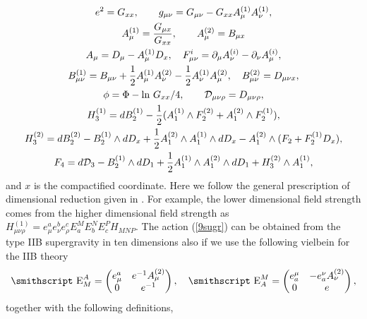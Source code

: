 \documentclass[a4paper,12pt]{article}
\newcommand{\mathst}[1]{\mbox{\smithscript #1}}
\begin{document}
\begin{subequations}
\begin{gather}
\label{iia29a}
e^2=G_{xx},\qquad g_{\mu\nu}=G_{\mu\nu}-
G_{xx}A^{(1)}_\mu A^{(1)}_\nu,\\
\label{iia29b}
A^{(1)}_\mu={G_{\mu x}\over G_{xx}},
\qquad A^{(2)}_\mu=B_{\mu x}\\
\label{iia29c}
A_\mu=D_\mu-A^{(1)}_\mu D_x,\quad
F^{i}_{\mu\nu}=\partial_\mu A^{(i)}_\nu
-\partial_\nu A^{(i)}_\mu,\\
\label{iia29d}
B^{(1)}_{\mu\nu}=B_{\mu\nu}+
{1\over 2}A^{(1)}_\mu A^{(2)}_\nu
-{1\over 2}A^{(1)}_\nu A^{(2)}_\mu,\quad 
B^{(2)}_{\mu\nu}=D_{\mu\nu x},\\
\label{iia29e}
\phi=\Phi-\ln\,G_{xx}/4, \qquad 
{\cal D}_{\mu\nu\rho}=D_{\mu\nu\rho},\\
\label{iia29f}
H_3^{(1)}=d B_2^{(1)}-{1\over 2}(A_1^{(1)}\wedge
F_2^{(2)}+A_1^{(2)}\wedge F_2^{(1)}),\\
\label{iia29g}
H_3^{(2)}=d B_2^{(2)}-B_2^{(1)}\wedge d D_x
+{1\over 2}A_1^{(2)} \wedge A_1^{(1)}\wedge d D_x
-A_1^{(2)} \wedge (F_2+ F_2^{(1)} D_x),\\
\label{iia29h}
F_4=d {\cal D}_3-B_2^{(1)}\wedge d D_1
+{1\over 2}A_1^{(1)}\wedge A_1^{(2)} \wedge d D_1
+H_3^{(2)} \wedge A_1^{(1)},
\end{gather}
\end{subequations}
and $x$ is the compactified coordinate. Here we 
follow the general
prescription of dimensional reduction given in
\cite{maharana92}. For example, the lower dimensional
field strength comes from the higher dimensional
field strength as $H^{(1)}_{\mu\nu\rho}=e^a_\mu e^b_\nu
e^c_\rho E^M_a E^N_b E^P_c H_{MNP}$.
The action (\ref{9sugr}) can be obtained from the type
IIB supergravity in ten dimensions also if we use the following
vielbein for the IIB theory \cite{bergshoeff95}
\begin{equation}
{\mathst E}^A_M=\begin{pmatrix}
e^a_\mu & e^{-1} A^{(2)}_\mu \\
0 & e^{-1}
\end{pmatrix},
\quad
{\mathst E}^M_A=\begin{pmatrix}
e_a^\mu & -e^\nu_a A^{(2)}_\nu\\
0 & e
\end{pmatrix},
\end{equation}
together with the following definitions,
\end{document}
